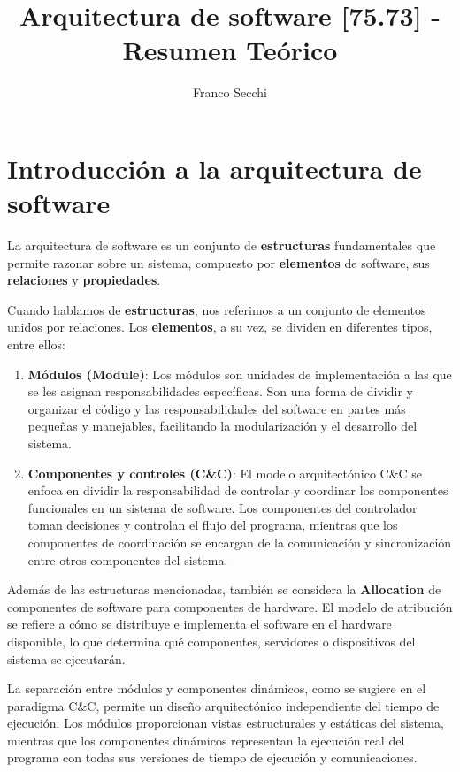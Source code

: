 \documentclass{article}
\title{Arquitectura de software [75.73] - Resumen Teórico}
\author{Franco Secchi}
\begin{document}
	\maketitle
	\renewcommand{\contentsname}{Contenidos} 

	\tableofcontents
	\newpage
		\section {Introducción a la arquitectura de software}
			La arquitectura de software es un conjunto de \textbf{estructuras} fundamentales que permite razonar sobre un sistema, compuesto por \textbf{elementos} de software, sus \textbf{relaciones} y \textbf{propiedades}.
			
			Cuando hablamos de \textbf{estructuras}, nos referimos a un conjunto de elementos unidos por relaciones. Los \textbf{elementos}, a su vez, se dividen en diferentes tipos, entre ellos:
			\begin{enumerate}
				\item \textbf{Módulos (Module)}: Los módulos son unidades de implementación a las que se les asignan responsabilidades específicas. Son una forma de dividir y organizar el código y las responsabilidades del software en partes más pequeñas y manejables, facilitando la modularización y el desarrollo del sistema.
				
				\item \textbf{Componentes y controles (C\&C)}: El modelo arquitectónico C\&C se enfoca en dividir la responsabilidad de controlar y coordinar los componentes funcionales en un sistema de software. Los componentes del controlador toman decisiones y controlan el flujo del programa, mientras que los componentes de coordinación se encargan de la comunicación y sincronización entre otros componentes del sistema.
				
			\end{enumerate}
			
			Además de las estructuras mencionadas, también se considera la \textbf{Allocation} de componentes de software para componentes de hardware. El modelo de atribución se refiere a cómo se distribuye e implementa el software en el hardware disponible, lo que determina qué componentes, servidores o dispositivos del sistema se ejecutarán.
			
			La separación entre módulos y componentes dinámicos, como se sugiere en el paradigma C\&C, permite un diseño arquitectónico independiente del tiempo de ejecución. Los módulos proporcionan vistas estructurales y estáticas del sistema, mientras que los componentes dinámicos representan la ejecución real del programa con todas sus versiones de tiempo de ejecución y comunicaciones.
		
\end{document}
